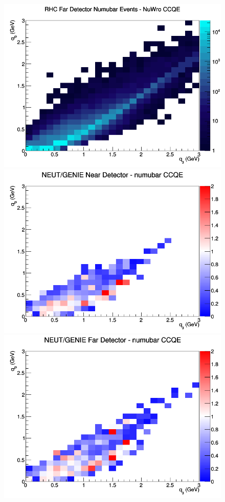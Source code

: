 \begin{figure}[h]
\endminipage
{}
\includegraphics[width=\linewidth]{eff_q0_q3/LAr/CCQE_RHC_FD_numubar_q3_q0_NuWro.png}
\endminipage
\newline
{}
\includegraphics[width=\linewidth]{eff_q0_q3/LAr/ratios/CCQE_NEUT_GENIE_numubar_near_q3_q0.png}
\endminipage
{}
\includegraphics[width=\linewidth]{eff_q0_q3/LAr/ratios/CCQE_NEUT_GENIE_numubar_far_q3_q0.png}

\end{figure}
